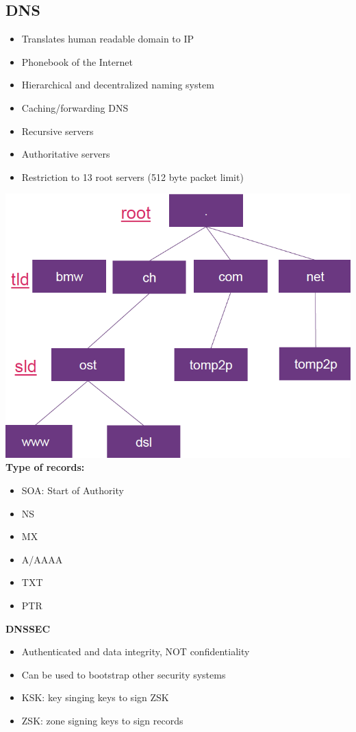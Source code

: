 \subsection{DNS}
\begin{itemize}
    \item Translates human readable domain to IP
    \item Phonebook of the Internet
    \item Hierarchical and decentralized naming system
    \item Caching/forwarding DNS
    \item Recursive servers
    \item Authoritative servers
    \item Restriction to 13 root servers (512 byte packet limit)
\end{itemize}
\includegraphics[width=\linewidth]{img/dns.png}
\textbf{Type of records:}
\begin{itemize}
    \item SOA: Start of Authority
    \item NS
    \item MX
    \item A/AAAA
    \item TXT
    \item PTR
\end{itemize}
\textbf{DNSSEC}
\begin{itemize}
    \item Authenticated and data integrity, NOT confidentiality
    \item Can be used to bootstrap other security systems
    \item KSK: key singing keys to sign ZSK
    \item ZSK: zone signing keys to sign records
\end{itemize}

